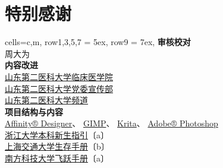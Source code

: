 \chapter*{特别感谢}
\vspace{-2ex}
\begin{table}[H]
    \centering
    \begin{tblr}[
            tall,
            theme = {no-caption},
            note{1} = {符号含义：\newline〔a〕:已获编委（主编）授权；〔b〕：已询问，暂未答复；〔c〕：未能联系到作者。},
        ]{
            cells={c,m},
            row{1,3,5,7} = {5ex},
            row{9} = {7ex},
        }
        {\large\textbf{审核校对}}                                                         \\
        {周大为}                                                                          \\
        {\large\textbf{内容改进}}                                                         \\
        {
        \href{https://xchb.sdsmu.edu.cn}{山东第二医科大学临床医学院}                      \\
        \href{https://xchb.sdsmu.edu.cn}{山东第二医科大学党委宣传部}                      \\
        \href{https://pd.qq.com/s/7mekdr5ve}{山东第二医科大学频道}
        }                                                                                 \\
        {\large\textbf{项目结构与内容}}                                       \\
        {
        \href{https://affinity.serif.com/zh-cn/designer}{Affinity® Designer}、%
        \href{https://www.gimp.org/}{GIMP}、%
        \href{https://krita.org/zh-cn}{Krita}、%
        \href{https://www.adobe.com/cn/creativecloud/roc/business.html}{Adobe® Photoshop} \\
        \href{https://zjuers.com/welcome}{%
        浙江大学本科新生指引}〔a〕                                                        \\
        \href{https://github.com/SurviveSJTU/SurviveSJTUManual}{%
        上海交通大学生存手册}〔b〕                                                        \\
        \href{https://github.com/SUSTech-Application/SUSTechapplication}{%
        南方科技大学飞跃手册}〔a〕                                                        \\
}
\end{tblr}
\end{table}
